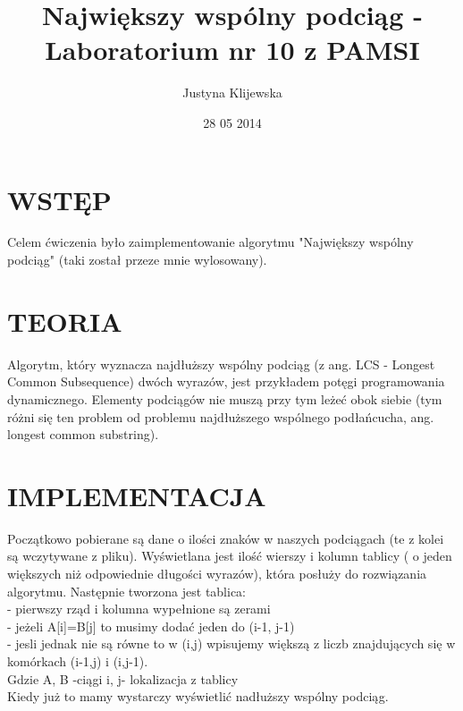 \documentclass[11pt]{article}
\begin{document}
\begin{titlepage}
\title{Największy wspólny podciąg - Laboratorium nr 10 z PAMSI}
\author{Justyna Klijewska}
\date{28 05 2014}
\maketitle
\end{titlepage}
\section{WSTĘP}
Celem ćwiczenia było zaimplementowanie algorytmu "Największy wspólny podciąg" (taki został przeze mnie wylosowany).\\
\section{TEORIA}
 Algorytm, który wyznacza najdłuższy wspólny podciąg (z ang. LCS - Longest Common Subsequence) dwóch wyrazów, jest przykładem potęgi programowania dynamicznego. Elementy podciągów nie muszą przy tym leżeć obok siebie (tym różni się ten problem od problemu najdłuższego wspólnego podłańcucha, ang. longest common substring).\\
\section{IMPLEMENTACJA}
Początkowo pobierane są dane o ilości znaków w naszych podciągach (te z kolei są wczytywane z pliku). Wyświetlana jest ilość wierszy i kolumn tablicy ( o jeden większych niż odpowiednie długości wyrazów), która posłuży do rozwiązania algorytmu. Następnie tworzona jest tablica: \\
- pierwszy rząd i kolumna wypełnione są zerami \\
- jeżeli A[i]=B[j] to musimy dodać jeden do (i-1, j-1) \\
- jesli jednak nie są równe to w (i,j) wpisujemy większą z liczb znajdujących się w komórkach (i-1,j) i (i,j-1).\\ Gdzie A, B -ciągi  i, j- lokalizacja z tablicy \\
Kiedy już to mamy wystarczy wyświetlić nadłuższy wspólny podciąg.\\ \\ \\ \\ \\ \\ \\ \\ \\
\end{document}
